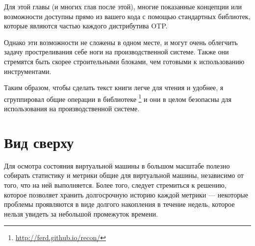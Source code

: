 Для этой главы (и многих глав после этой), многие показанные концепции или возможности доступны прямо из вашего кода с помощью стандартных библиотек, которые являются частью каждого дистрибутива OTP.

Однако эти возможности не сложены в одном месте, и могут очень облегчить задачу простреливания себе ноги на производственной системе. Также они стремятся быть скорее строительными блоками, чем готовыми к использованию инструментами.

Таким образом, чтобы сделать текст книги легче для чтения и удобнее, я сгруппировал общие операции в библиотеке \footnote{\href{http://ferd.github.io/recon/}{http://ferd.github.io/recon/}} и они в целом безопасны для использования на производственной системе.

\section{Вид сверху}
\label{sec:global-view}

Для осмотра состояния виртуальной машины в большом масштабе полезно собирать статистику и метрики общие для виртуальной машины, независимо от того, что на ней выполняется. Более того, следует стремиться к решению, которое позволяет хранить долгосрочную историю каждой метрики --- некоторые проблемы проявляются в виде долгого накопления в течение недель, которое нельзя увидеть за небольшой промежуток времени.

